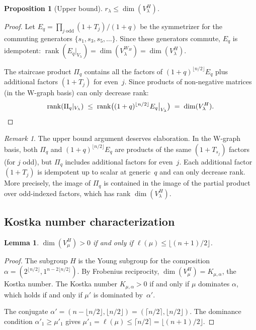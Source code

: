 \documentclass[11pt]{article}
\newtheorem{lemma}[theorem]{Lemma}
\newtheorem{proposition}[theorem]{Proposition}
\theoremstyle{definition}
\theoremstyle{remark}
\newtheorem{remark}[theorem]{Remark}
\DeclareMathOperator{\rank}{rank}
\begin{document}
\begin{proposition}[Upper bound]\label{prop:upper}
$r_\lambda \le \dim(V_\lambda^H)$.
\end{proposition}

\begin{proof}
Let $E_q = \prod_{j\;\text{odd}} (1+T_j)/(1+q)$ be the symmetrizer
for the commuting generators $\{s_1,s_3,s_5,\ldots\}$. Since these
generators commute, $E_q$ is idempotent:
$\rank(E_q|_{V_\lambda}) = \dim(V_\lambda^{W_H}) = \dim(V_\lambda^H)$.

The staircase product $\Pi_q$ contains all the factors of
$(1+q)^{\lfloor n/2\rfloor} E_q$ plus additional factors
$(1+T_j)$ for even~$j$. Since products of non-negative matrices
(in the W-graph basis) can only decrease rank:
\[
  \rank(\Pi_q|_{V_\lambda})
  \;\le\; \rank\bigl((1+q)^{\lfloor n/2\rfloor}E_q\big|_{V_\lambda}\bigr)
  \;=\; \dim(V_\lambda^H).  \qedhere
\]
\end{proof}

\begin{remark}
The upper bound argument deserves elaboration.
In the W-graph basis, both $\Pi_q$ and
$(1+q)^{\lfloor n/2\rfloor} E_q$ are products of the same
$(1+T_{s_j})$ factors (for $j$ odd), but $\Pi_q$ includes additional
factors for even~$j$. Each additional factor $(1+T_j)$ is idempotent
up to scalar at generic~$q$ and can only decrease rank. More precisely,
the image of $\Pi_q$ is contained in the image of the partial product
over odd-indexed factors, which has rank $\dim(V_\lambda^H)$.
\end{remark}

\subsection{Kostka number characterization}

\begin{lemma}\label{lem:kostka}
$\dim(V_\mu^H) > 0$ if and only if $\ell(\mu) \le \lfloor(n+1)/2\rfloor$.
\end{lemma}

\begin{proof}
The subgroup $H$ is the Young subgroup for the composition
$\alpha = (2^{\lfloor n/2\rfloor}, 1^{n - 2\lfloor n/2\rfloor})$.
By Frobenius reciprocity,
$\dim(V_\mu^H) = K_{\mu,\alpha}$, the Kostka number.
The Kostka number $K_{\mu,\alpha} > 0$ if and only if $\mu$ dominates
$\alpha$, which holds if and only if $\mu'$ is dominated by~$\alpha'$.

The conjugate $\alpha' = (n - \lfloor n/2\rfloor, \lfloor n/2\rfloor)
= (\lceil n/2\rceil, \lfloor n/2\rfloor)$.
The dominance condition $\alpha'_1 \ge \mu'_1$ gives
$\mu'_1 = \ell(\mu) \le \lceil n/2\rceil = \lfloor(n+1)/2\rfloor$.
\end{proof}
\end{document}
